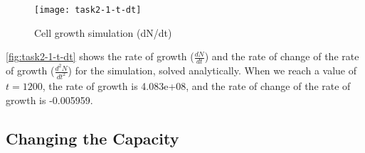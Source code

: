 \begin{figure}[ht]
    \centering
    \texttt{[image: task2-1-t-dt]}
    \caption[Cell growth simulation (dN/dt)]{Cell growth simulation (dN/dt)}
    \label{fig:task2-1-t-dt}
\end{figure}









\autoref{fig:task2-1-t-dt} shows the rate of growth ($\frac{dN}{dt}$) and the rate of change of the rate of growth ($\frac{d^2N}{dt^2}$) for the simulation, solved analytically.
When we reach a value of $t = 1200$, the rate of growth is 4.083e+08, and the rate of change of the rate of growth is -0.005959.

\clearpage

\subsection{Changing the Capacity}

